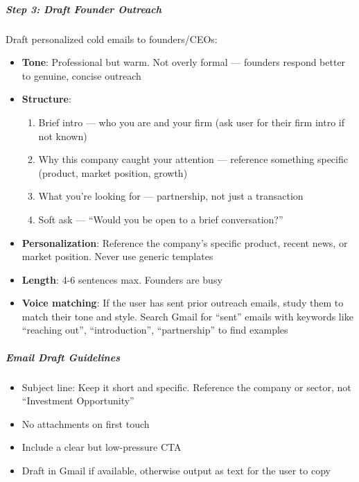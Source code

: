 \documentclass[11pt]{article}
\begin{document}
\subparagraph{Step 3: Draft Founder Outreach}\mbox{}\par

Draft personalized cold emails to founders/CEOs:


\begin{itemize}[leftmargin=*,itemsep=2pt,topsep=2pt]
\item {} \textbf{Tone}: Professional but warm. Not overly formal — founders respond better to genuine, concise outreach
\item {} \textbf{Structure}:
\begin{enumerate}[leftmargin=*,itemsep=2pt,topsep=2pt]
\item {} Brief intro — who you are and your firm (ask user for their firm intro if not known)
\item {} Why this company caught your attention — reference something specific (product, market position, growth)
\item {} What you're looking for — partnership, not just a transaction
\item {} Soft ask — ``Would you be open to a brief conversation?''
\end{enumerate}
\item {} \textbf{Personalization}: Reference the company's specific product, recent news, or market position. Never use generic templates
\item {} \textbf{Length}: 4-6 sentences max. Founders are busy
\item {} \textbf{Voice matching}: If the user has sent prior outreach emails, study them to match their tone and style. Search Gmail for ``sent'' emails with keywords like ``reaching out'', ``introduction'', ``partnership'' to find examples
\end{itemize}

\subparagraph{Email Draft Guidelines}\mbox{}\par

\begin{itemize}[leftmargin=*,itemsep=2pt,topsep=2pt]
\item {} Subject line: Keep it short and specific. Reference the company or sector, not ``Investment Opportunity''
\item {} No attachments on first touch
\item {} Include a clear but low-pressure CTA
\item {} Draft in Gmail if available, otherwise output as text for the user to copy
\end{itemize}
\end{document}
